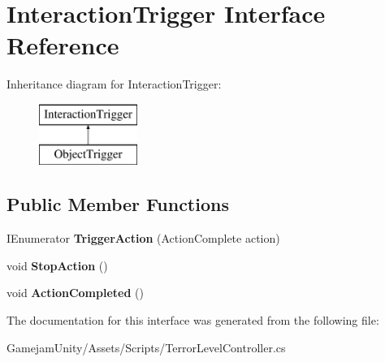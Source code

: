 \hypertarget{interface_interaction_trigger}{}\section{Interaction\+Trigger Interface Reference}
\label{interface_interaction_trigger}
Inheritance diagram for Interaction\+Trigger\+:\begin{figure}[H]
\begin{center}
\leavevmode
\includegraphics[height=2.000000cm]{interface_interaction_trigger}
\end{center}
\end{figure}
\subsection*{Public Member Functions}
\begin{DoxyCompactItemize}
\item 
\mbox{\label{interface_interaction_trigger_a0a5bff66e684f928a92c042fadbea146}} 
I\+Enumerator {\bfseries Trigger\+Action} (Action\+Complete action)
\item 
\mbox{\label{interface_interaction_trigger_adcef766c061402978863e72d622d1998}} 
void {\bfseries Stop\+Action} ()
\item 
\mbox{\label{interface_interaction_trigger_a60432c03fbcad7c76a9078acaec32fe1}} 
void {\bfseries Action\+Completed} ()
\end{DoxyCompactItemize}


The documentation for this interface was generated from the following file\+:\begin{DoxyCompactItemize}
\item 
Gamejam\+Unity/\+Assets/\+Scripts/Terror\+Level\+Controller.\+cs\end{DoxyCompactItemize}
